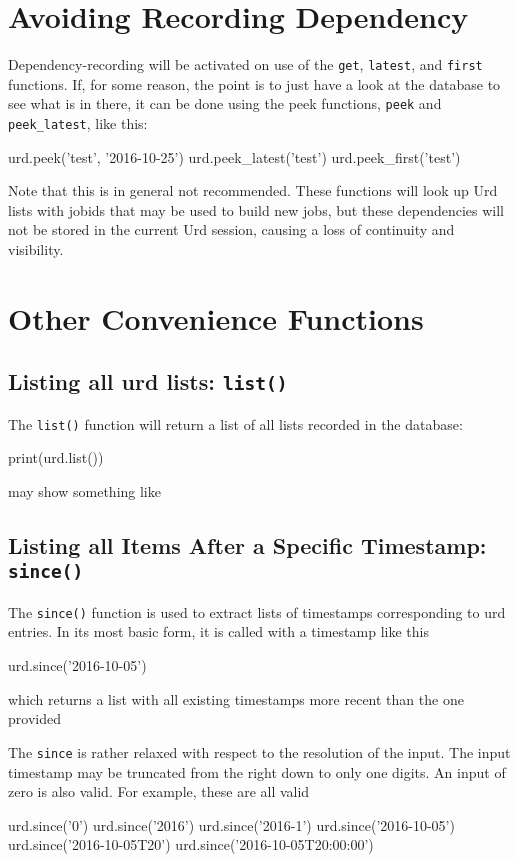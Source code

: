 \section{Avoiding Recording Dependency}
Dependency-recording will be activated on use of the \texttt{get},
\texttt{latest}, and \texttt{first} functions.  If, for some reason,
the point is to just have a look at the database to see what is in
there, it can be done using the peek functions, \texttt{peek} and
\texttt{peek\_latest}, like this:
\begin{python}
urd.peek('test', '2016-10-25')
urd.peek_latest('test')
urd.peek_first('test')
\end{python}
Note that this is in general not recommended.  These functions will
look up Urd lists with jobids that may be used to build new jobs, but
these dependencies will not be stored in the current Urd session,
causing a loss of continuity and visibility.



\section{Other Convenience Functions}
\subsection{Listing all urd lists:  \texttt{list()}}
The \texttt{list()} function will return a list of all lists recorded in
the database:
\begin{python}
print(urd.list())
\end{python}
may show something like
\begin{shell}
\end{shell}


\subsection{Listing all Items After a Specific Timestamp:  \texttt{since()}}
The \texttt{since()} function is used to extract lists of timestamps
corresponding to urd entries.  In its most basic form, it is called
with a timestamp like this
\begin{python}
urd.since('2016-10-05')
\end{python}
which returns a list with all existing timestamps more recent than the
one provided
\begin{shell}
['2016-10-06', '2016-10-07', '2016-10-08', '2016-10-09', '2016-10-09T20']
\end{shell}
The \texttt{since} is rather relaxed with respect to the resolution of
the input.  The input timestamp may be truncated from the right down
to only one digits.  An input of zero is also valid.  For example,
these are all valid
\begin{python}
urd.since('0')
urd.since('2016')
urd.since('2016-1')
urd.since('2016-10-05')
urd.since('2016-10-05T20')
urd.since('2016-10-05T20:00:00')
\end{python}




